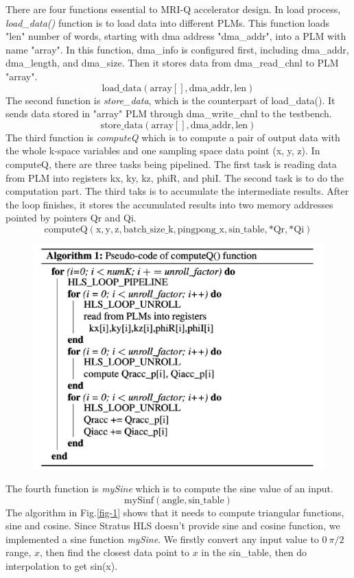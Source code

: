 There are four functions essential to MRI-Q accelerator design. In load process,
\textit{load\_data()} function is to load data into different PLMs. This
function loads "len" number of words, starting with dma address "dma\_addr",
into a PLM with name "array". In this function, dma\_info is configured first,
including dma\_addr, dma\_length, and dma\_size. Then it stores data from
dma\_read\_chnl to PLM "array".
%
$$\mathrm{load\_data(array[], dma\_addr, len)}$$
%
The second function is \textit{store\_data}, which is the counterpart of
load\_data(). It sends data stored in "array" PLM through dma\_write\_chnl to
the testbench.
%
$$\mathrm{store\_data(array[], dma\_addr, len)}$$
%
The third function is \textit{computeQ} which is to compute a pair of output
data with the whole k-space variables and one sampling space data point (x, y,
z). In computeQ, there are three tasks being pipelined. The first task is
reading data from PLM into registers kx, ky, kz, phiR, and phiI. The second task
is to do the computation part. The third taks is to accumulate the intermediate
results. After the loop finishes, it stores the accumulated results into two
memory addresses pointed by pointers Qr and Qi.
%
$$\mathrm{computeQ(x, y, z, batch\_size\_k, pingpong\_x, sin\_table, *Qr, *Qi)}$$

\begin{figure}[t]
\centering
\captionsetup{justification=centering, format=hang}
\includegraphics[width=\columnwidth]{figures/computeQAlgorithm}
\label{fig-data-convert}
\end{figure}

The fourth function is \textit{mySine} which is to compute the sine value of an
input.
%
$$\mathrm{mySinf(angle, sin\_table)}$$
%
The algorithm in Fig.\ref{fig-1} shows
that it needs to compute triangular functions, sine and cosine. Since Stratus
HLS doesn't provide sine and cosine function, we implemented a sine function
\textit{mySine}. We firstly convert any input value to $0~\pi/2$ range, $x$,
then find the closest data point to $x$ in the sin\_table, then do interpolation
to get sin(x).  \\

